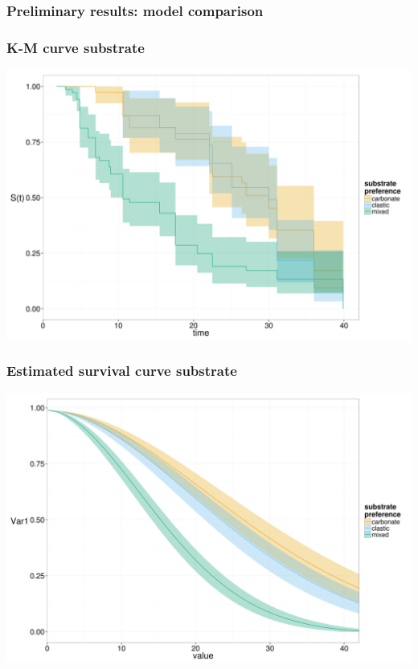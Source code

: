\documentclass{beamer}
\begin{document}
\begin{frame}
  \frametitle{Preliminary results: model comparison}

  
\end{frame}

\begin{frame}
  \frametitle{K-M curve substrate}
  \begin{center}
    \includegraphics[height = 0.8\textheight, width = \textwidth, keepaspectratio = true]{figure/km_aff}
  \end{center}
\end{frame}

\begin{frame}
  \frametitle{Estimated survival curve substrate}
  \begin{center}
    \includegraphics[height = 0.8\textheight, width = \textwidth, keepaspectratio = true]{figure/aff}
  \end{center}
\end{frame}
\end{document}
